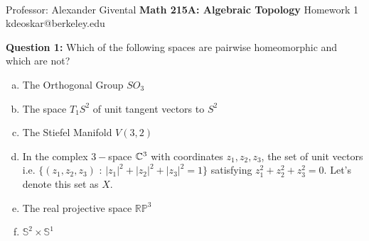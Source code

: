 \documentclass[11pt]{article}
\begin{document}
\thispagestyle{empty}
\bigskip \
\vspace{0.1cm}

\begin{center}
{\fontsize{22}{22} \selectfont Professor: Alexander Givental}
\vskip 16pt
{\fontsize{30}{30} \selectfont \bf \sffamily Math 215A: Algebraic Topology}
\vskip 24pt
{\fontsize{14}{14} \selectfont \rmfamily Homework 1} 
\vskip 6pt
{\fontsize{14}{14} \selectfont \ttfamily kdeoskar@berkeley.edu} 
\vskip 24pt
\end{center}



\begin{bluebox}
  \textbf{Question 1:} Which of the following spaces are pairwise homeomorphic and which are not? 
  \begin{enumerate}[(a)]
    \item The Orthogonal Group $SO_3$
    \item The space $T_1 S^2$ of unit tangent vectors to $S^2$
    \item The Stiefel Manifold $V(3, 2)$
    \item In the complex $3-$space $\mathbb{C}^3$ with coordinates $z_1, z_2, z_3$, the set of unit vectors i.e. $\{ (z_1, z_2, z_3) \text{ : } |z_1|^2 + |z_2|^2 + |z_3|^2 = 1 \}$ satisfying $z_1^2 + z_2^2 + z_3^2 = 0$. Let's denote this set as $X$.
    \item The real projective space $\mathbb{RP}^3$
    \item $\mathbb{S}^2 \times \mathbb{S}^1$
  \end{enumerate}
\end{bluebox}
\end{document}
